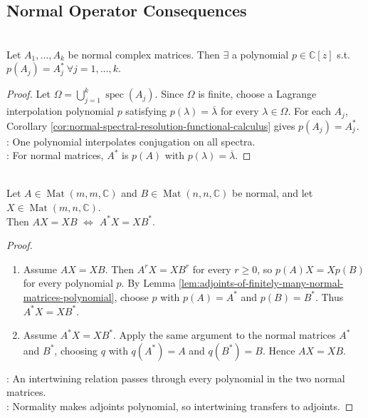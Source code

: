 \subsection{Normal Operator Consequences}

\begin{lemma} \label{lem:adjoints-of-finitely-many-normal-matrices-polynomial} \\
Let $A_1,\ldots,A_k$ be normal complex matrices. Then $\exists$ a polynomial $p\in\mathbb{C}[z]$ s.t. $p(A_j)=A_j^* \ \forall j=1,\ldots,k$.
\begin{proof}
Let $\Omega=\bigcup\limits_{j=1}^{k}\operatorname{spec}(A_j)$. Since $\Omega$ is finite, choose a Lagrange interpolation polynomial $p$ satisfying $p(\lambda)=\overline{\lambda}$ for every $\lambda\in\Omega$. For each $A_j$, Corollary \ref{cor:normal-spectral-resolution-functional-calculus} gives $p(A_j)=A_j^*$.\\
: One polynomial interpolates conjugation on all spectra.\\
: For normal matrices, $A^*$ is $p(A)$ with $p(\lambda)=\overline{\lambda}$.
\end{proof}
\end{lemma}

\begin{theorem} \label{thm:fuglede-putnam-normal-intertwining} \\
Let $A\in\operatorname{Mat}(m,m,\mathbb{C})$ and $B\in\operatorname{Mat}(n,n,\mathbb{C})$ be normal, and let $X\in\operatorname{Mat}(m,n,\mathbb{C})$.\\
Then $AX=XB$ $\Longleftrightarrow$ $A^*X=XB^*$.
\begin{proof}
\begin{enumerate}[label=\roman*.]
\setlength{\itemsep}{0pt}
\item[$(\Rightarrow)$] Assume $AX=XB$. Then $A^rX=XB^r$ for every $r\geq0$, so $p(A)X=Xp(B)$ for every polynomial $p$. By Lemma \ref{lem:adjoints-of-finitely-many-normal-matrices-polynomial}, choose $p$ with $p(A)=A^*$ and $p(B)=B^*$. Thus $A^*X=XB^*$.
\item[$(\Leftarrow)$] Assume $A^*X=XB^*$. Apply the same argument to the normal matrices $A^*$ and $B^*$, choosing $q$ with $q(A^*)=A$ and $q(B^*)=B$. Hence $AX=XB$.
\end{enumerate}
: An intertwining relation passes through every polynomial in the two normal matrices.\\
: Normality makes adjoints polynomial, so intertwining transfers to adjoints.
\end{proof}
\end{theorem}

